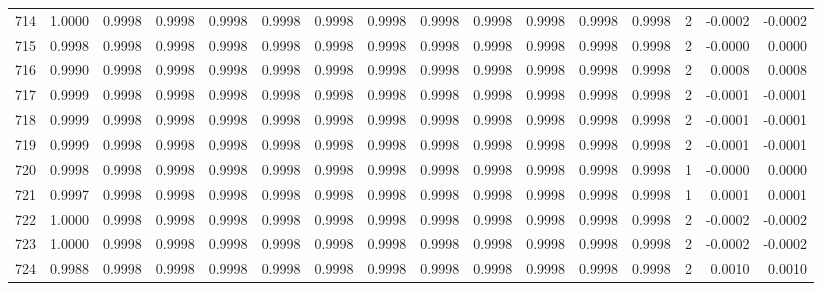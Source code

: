 \begin{tabular}{lrrrrrrrrrrrrrrr}
714 &      1.0000 &  0.9998 &  0.9998 &  0.9998 &  0.9998 &  0.9998 &  0.9998 &  0.9998 &  0.9998 &  0.9998 &   0.9998 &     0.9998 &      2 &                   -0.0002 &                    -0.0002 \\
715 &      0.9998 &  0.9998 &  0.9998 &  0.9998 &  0.9998 &  0.9998 &  0.9998 &  0.9998 &  0.9998 &  0.9998 &   0.9998 &     0.9998 &      2 &                   -0.0000 &                     0.0000 \\
716 &      0.9990 &  0.9998 &  0.9998 &  0.9998 &  0.9998 &  0.9998 &  0.9998 &  0.9998 &  0.9998 &  0.9998 &   0.9998 &     0.9998 &      2 &                    0.0008 &                     0.0008 \\
717 &      0.9999 &  0.9998 &  0.9998 &  0.9998 &  0.9998 &  0.9998 &  0.9998 &  0.9998 &  0.9998 &  0.9998 &   0.9998 &     0.9998 &      2 &                   -0.0001 &                    -0.0001 \\
718 &      0.9999 &  0.9998 &  0.9998 &  0.9998 &  0.9998 &  0.9998 &  0.9998 &  0.9998 &  0.9998 &  0.9998 &   0.9998 &     0.9998 &      2 &                   -0.0001 &                    -0.0001 \\
719 &      0.9999 &  0.9998 &  0.9998 &  0.9998 &  0.9998 &  0.9998 &  0.9998 &  0.9998 &  0.9998 &  0.9998 &   0.9998 &     0.9998 &      2 &                   -0.0001 &                    -0.0001 \\
720 &      0.9998 &  0.9998 &  0.9998 &  0.9998 &  0.9998 &  0.9998 &  0.9998 &  0.9998 &  0.9998 &  0.9998 &   0.9998 &     0.9998 &      1 &                   -0.0000 &                     0.0000 \\
721 &      0.9997 &  0.9998 &  0.9998 &  0.9998 &  0.9998 &  0.9998 &  0.9998 &  0.9998 &  0.9998 &  0.9998 &   0.9998 &     0.9998 &      1 &                    0.0001 &                     0.0001 \\
722 &      1.0000 &  0.9998 &  0.9998 &  0.9998 &  0.9998 &  0.9998 &  0.9998 &  0.9998 &  0.9998 &  0.9998 &   0.9998 &     0.9998 &      2 &                   -0.0002 &                    -0.0002 \\
723 &      1.0000 &  0.9998 &  0.9998 &  0.9998 &  0.9998 &  0.9998 &  0.9998 &  0.9998 &  0.9998 &  0.9998 &   0.9998 &     0.9998 &      2 &                   -0.0002 &                    -0.0002 \\
724 &      0.9988 &  0.9998 &  0.9998 &  0.9998 &  0.9998 &  0.9998 &  0.9998 &  0.9998 &  0.9998 &  0.9998 &   0.9998 &     0.9998 &      2 &                    0.0010 &                     0.0010 \\

\end{tabular}
